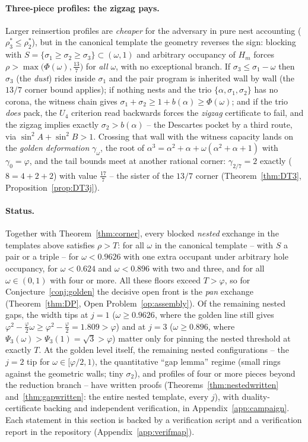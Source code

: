 \documentclass[11pt]{article}
\theoremstyle{definition}
\begin{document}
\paragraph{Three-piece profiles: the zigzag pays.}
Larger reinsertion profiles are \emph{cheaper} for the adversary in pure
nest accounting ($\rho^*_3\le\rho^*_2$), but in the canonical template the
geometry reverses the sign: blocking with $S=\{\sigma_1\ge\sigma_2\ge
\sigma_3\}\subset(\omega,1)$ and arbitrary occupancy of $H_m$ forces
$\rho>\max\bigl(\Phi(\omega),\tfrac{13}7\bigr)$ for \emph{all} $\omega$,
with no exceptional branch. If $\sigma_3\le\sigma_1-\omega$ then $\sigma_3$ (the \emph{dust}) rides
inside $\sigma_1$ and the pair program is inherited wall by wall
(the $13/7$ corner bound applies); if nothing nests and the trio
$\{\alpha,\sigma_1,\sigma_2\}$ has no corona, the witness chain gives
$\sigma_1+\sigma_2\ge1+b(\alpha)\ge\Phi(\omega)$; and if the trio
\emph{does} pack, the $U_4$ criterion read backwards forces the \emph{zigzag}
certificate to fail, and the zigzag implies exactly $\sigma_2>b(\alpha)$
-- the Descartes pocket by a third route, via
$\sin^2\!A+\sin^2\!B>1$. Crossing that wall with the witness capacity
lands on the \emph{golden deformation} $\gamma_\omega$, the root of
$\alpha^3=\alpha^2+\alpha+\omega(\alpha^2+\alpha+1)$ with
$\gamma_0=\varphi$, and the tail bounds meet at another rational corner:
$\gamma_{2/7}=2$ exactly ($8=4+2+2$) with value $\tfrac{17}7$ -- the
sister of the $13/7$ corner
(Theorem~\ref{thm:DT3}, Proposition~\ref{prop:DT3j}).

\paragraph{Status.}
Together with Theorem~\ref{thm:corner}, every blocked \emph{nested}
exchange in the templates above satisfies $\rho>T$: for all $\omega$ in
the canonical template -- with $S$ a pair or a triple -- for
$\omega<0.9626$ with one extra occupant under arbitrary hole occupancy,
for $\omega<0.624$ and $\omega<0.896$ with two and three, and for all
$\omega\in(0,1)$ with four or more. All these floors exceed $T>\varphi$, so for
Conjecture~\ref{conj:golden} the decisive open front is the \emph{pan}
exchange (Theorem~\ref{thm:DP}, Open Problem~\ref{op:assembly}). Of the
remaining nested gaps, the width tips at $j=1$ ($\omega\ge0.9626$,
where the golden line still gives $\varphi^2-\tfrac\varphi2\omega
\ge\varphi^2-\tfrac\varphi2=1.809>\varphi$) and at $j=3$
($\omega\ge0.896$, where $\Psi_3(\omega)>\Psi_3(1)=\sqrt3>\varphi$)
matter only for pinning the nested threshold at exactly $T$. At the
golden level itself, the remaining nested configurations -- the
$j=2$ tip for $\omega\in[\varphi/2,1)$, the quantitative ``gap
lemma'' regime (small rings against the geometric walls; tiny
$\sigma_2$), and profiles of four or more pieces beyond the
reduction branch -- have written proofs
(Theorems~\ref{thm:nestedwritten} and~\ref{thm:gapwritten}: the
entire nested template, every $j$), with duality-certificate
backing and independent verification, in
Appendix~\ref{app:campaign}. Each statement in this section is
backed by a verification script and a verification report in the
repository (Appendix~\ref{app:verifmap}).
\end{document}
